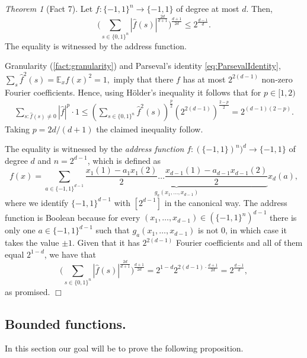 \documentclass[11pt]{article}
\theoremstyle{plain}
\theoremstyle{plain}
\theoremstyle{definition}
\theoremstyle{remark}
\renewenvironment{proof}[1][]{
    \begin{trivlist}
    \item[\hspace{\labelsep}{\em\noindent Proof#1:\/}]}
    {{\hfill$\Box$}
    \end{trivlist}
}
\theoremstyle{named}
\newtheorem*{namedtheorem}{Theorem}
\begin{document}
\begin{namedtheorem}[Fact 7]
    Let $f:\{-1,1\}^n\to\{-1,1\}$ of degree at most $d$. Then, 
    $$
    \Big(\sum_{s\in\{0,1\}^n}|\widehat f(s)|^{\frac{2d}{d+1}}\Big)^{\frac{d+1}{2d}}\leq  2^{\frac{d-1}{d}}.$$
    The equality is witnessed by the address function.  
    
\end{namedtheorem}
\begin{proof}
    Granularity (\cref{fact:granularity}) and  Parseval's identity \cref{eq:ParsevalIdentity}, $\sum_{s}\widehat f^2(s)=\mathbb E_x f(x)^2=1,$  imply that there $f$ has at most $2^{2(d-1)}$ non-zero Fourier coefficients. Hence, using H\"older's inequality it follows that for $p\in [1,2)$
    \begin{align*}
        \sum_{s:\widehat f(s)\neq 0}|\widehat f|^p\cdot 1\leq \left(\sum_{s\in\{0,1\}^n}\widehat{f}^2(s)\right)^{\frac{p}{2}}\left(2^{2(d-1)}\right)^{\frac{2-p}{2}}=2^{(d-1)(2-p)}.
    \end{align*}
    Taking $p=2d/(d+1)$ the claimed inequality follow. 
    
    The equality is witnessed by the \emph{address function} $f:(\{-1,1\})^{n})^d\to \{-1,1\}$ of degree $d$ and $n=2^{d-1}$, which is defined as 
    \begin{equation}
        f(x)=\sum_{a\in \{-1,1\}^{d-1}}\underbrace{\frac{x_1(1)-a_1x_1(2)}{2}\dots \frac{x_{d-1}(1)-a_{d-1}x_{d-1}(2)}{2}}_{g_a(x_1,\dots,x_{d-1})}x_{d}(a),
    \end{equation}
    where we identify $\{-1,1\}^{d-1}$ with $[2^{d-1}]$ in the canonical way. The address function is Boolean because for every $(x_1,\dots,x_{d-1})\in (\{-1,1\}^{n})^{d-1}$ there is only one $a\in \{-1,1\}^{d-1}$ such that $g_a(x_1,\dots,x_{d-1})$ is not $0$, in which case it takes the value $\pm 1$. Given that it has $2^{2(d-1)}$ Fourier coefficients and all of them equal $2^{1-d}$, we have that $$\Big(\sum_{s\in\{0,1\}^n}|\widehat f(s)|^{\frac{2d}{d+1}}\Big)^{\frac{d+1}{2d}}=2^{1-d}2^{2(d-1)\cdot \frac{d+1}{2d}}=2^{\frac{d-1}{d}},$$
    as promised.
\end{proof}


\subsection{Bounded functions.}

In this section our goal will be to prove the following proposition.
\end{document}
